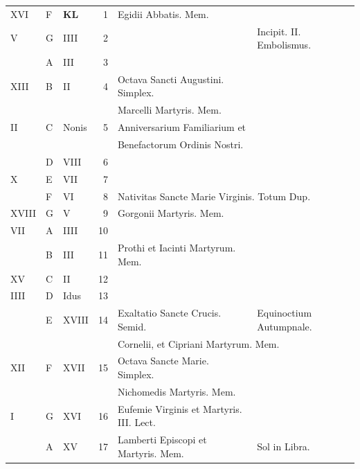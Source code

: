 \documentclass[11pt,openany]{book}
\begin{document}
\begin{center}
\begin{tabular}{l | l | l | r | l l}
\color{Red} XVI & F & \textbf{\color{Red} K\color{Blue}L} & 1 & Egidii Abbatis. Mem. & \color{Red} \\
\color{Red} V & G & \color{Red} IIII & 2 & & \color{Red} Incipit. II. Embolismus. \\
\color{Red}  & \color{Red} A & \color{Red} III & 3 & & \color{Red} \\
\color{Red} XIII & B & \color{Red} II & 4 & Octava Sancti Augustini. Simplex. & \color{Red} \\
& & & & \qquad Marcelli Martyris. Mem. \\
\color{Red} II & C & \color{Red} Nonis & 5 & Anniversarium Familiarium et & \color{Red} \\
& & & & \qquad Benefactorum Ordinis Nostri. \\
\color{Red}  & D & \color{Red} VIII & 6 & & \color{Red} \\
\color{Red} X & E & \color{Red} VII & 7 & & \color{Red} \\
\color{Red}  & F & \color{Red} VI & 8 & \multicolumn{2}{l}{\color{Red} Nativitas Sancte Marie Virginis. Totum Dup.} \\
\color{Red} XVIII & G & \color{Red} V & 9 & Gorgonii Martyris. \color{Red} Mem. \\
\color{Red} VII & \color{Red} A & \color{Red} IIII & 10 & & \color{Red} \\
\color{Red}  & B & \color{Red} III & 11 & \color{Red} Prothi et Iacinti Martyrum. Mem. \\
\color{Red} XV & C & \color{Red} II & 12 & & \color{Red} \\
\color{Red} IIII & D & \color{Red} Idus & 13 & & \color{Red} \\
\color{Red}  & E & \color{Red} XVIII & 14 & Exaltatio Sancte Crucis. Semid. & Equinoctium Autumpnale. \color{Red} \\
& & & & \multicolumn{2}{l}{\qquad Cornelii, et Cipriani Martyrum. Mem.} \\
\color{Red} XII & F & \color{Red} XVII & 15 & Octava Sancte Marie. Simplex. & \color{Red} \\
& & & & \qquad Nichomedis Martyris. Mem. \\
\color{Red} I & G & \color{Red} XVI & 16 & Eufemie Virginis et Martyris. III. Lect. & \color{Red} \\
\color{Red}  & \color{Red} A & \color{Red} XV & 17 & Lamberti Episcopi et Martyris. Mem. & \color{Red} Sol in Libra. \\

\end{tabular}
\end{center}
\end{document}

